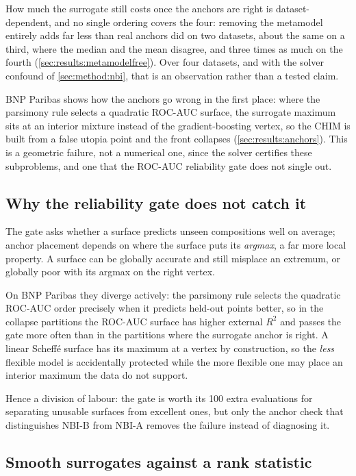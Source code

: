 How much the surrogate still costs once the anchors are right is dataset-dependent, and no single ordering covers the
four: removing the metamodel entirely adds far less than real anchors did on two datasets, about the same on a third,
where the median and the mean disagree, and three times as much on the fourth (\cref{sec:results:metamodelfree}). Over
four datasets, and with the solver confound of \cref{sec:method:nbi}, that is an observation rather than a tested
claim.

BNP Paribas shows how the anchors go wrong in the first place: where the parsimony rule selects a quadratic ROC-AUC
surface, the surrogate maximum sits at an interior mixture instead of the gradient-boosting vertex, so the CHIM is
built from a false utopia point and the front collapses (\cref{sec:results:anchors}). This is a geometric failure,
not a numerical one, since the solver certifies these subproblems, and one that the ROC-AUC reliability gate does not
single out.

\subsection{Why the reliability gate does not catch it}
\label{sec:disc:gate}

The gate asks whether a surface predicts unseen compositions well on average; anchor placement depends on where the
surface puts its \emph{argmax}, a far more local property. A surface can be globally accurate and still misplace an
extremum, or globally poor with its argmax on the right vertex.

On BNP Paribas they diverge actively: the parsimony rule selects the quadratic ROC-AUC order precisely when it
predicts held-out points better, so in the collapse partitions the ROC-AUC surface has higher external $R^2$ and
passes the gate more often than in the partitions where the surrogate anchor is right. A linear Scheff\'e surface has
its maximum at a vertex by
construction, so the \emph{less} flexible model is accidentally protected while the more flexible one may place an
interior maximum the data do not support.

Hence a division of labour: the gate is worth its 100 extra evaluations for separating unusable surfaces from
excellent ones, but only the anchor check that distinguishes NBI-B from NBI-A removes the failure instead of
diagnosing it.

\subsection{Smooth surrogates against a rank statistic}
\label{sec:disc:smooth}

